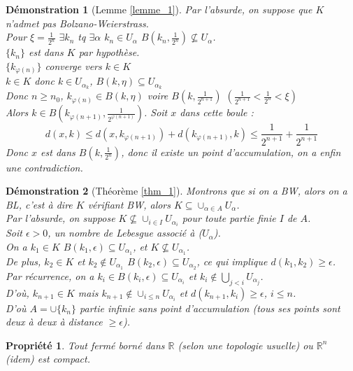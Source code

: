 \documentclass[a4paper, oneside]{report}
\theoremstyle{break}
\newtheorem{propr}[thm]{Propriété}
\newtheorem*{demo}{Démonstration}
\newcommand{\R}{\mathbb{R}}
\newcommand{\fracun}[1]{\frac{1}{#1}}
\begin{document}
\begin{demo}[Lemme \ref{lemme_1}]
Par l'absurde, on suppose que $K$ n'admet pas Bolzano-Weierstrass.\\
Pour $\xi = \fracun{2^n}$ $\exists k_n$ tq $\exists \alpha$ $k_n \in U_\alpha $ $B(k_n, \fracun{2^n}) \nsubseteq U_\alpha$.\\
$\{k_n\}$ est dans $K$ par hypothèse.\\
$\{k_{\varphi(n)}\}$ converge vers $k\in K$\\
$k\in K$ donc $k\in U_{\alpha_k}$, $B(k,\eta) \subseteq U_{\alpha_k}$\\
Donc $n\geq n_0$, $k_{\varphi(n)} \in B(k,\eta)$ voire $B(k,\fracun{2^{n+1}})$ $(\fracun{2^{n+1}} < \fracun{2^n}< \xi)$\\
Alors $k\in B(k_{\varphi(n+1)}, \fracun{2^{\varphi (n+1)}})$. Soit $x$ dans cette boule :
$$d(x,k) \leq d(x,k_{\varphi (n+1)}) + d(k_{\varphi (n+1)}, k) \leq \fracun{2^{n+1}} + \fracun{2^{n+1}}$$
Donc $x$ est dans $B(k,\fracun{2^n})$, donc il existe un point d'accumulation, on a enfin une contradiction.
\end{demo}


\begin{demo}[Théorème \ref{thm_1}]
Montrons que si on a BW, alors on a BL, c'est à dire $K$ vérifiant BW, alors $K\subseteq \cup_{\alpha \in A} U_\alpha$.\\
Par l'absurde, on suppose $K \nsubseteq \cup_{i\in I} U_{\alpha_i}$ pour toute partie finie $I$ de $A$.\\
Soit $\epsilon >0$, un nombre de Lebesgue associé à ($U_\alpha$).\\
On a $k_1\in K$ $B(k_1,\epsilon) \subseteq U_{\alpha_1}$, et $K\nsubseteq U_{\alpha_1}$.\\
De plus, $k_2\in K$ et $k_2\notin U_{\alpha_1}$ $B(k_2,\epsilon) \subseteq U_{\alpha_2}$, ce qui implique $d(k_1,k_2)\geq \epsilon$.\\
Par récurrence, on a $k_i\in B(k_i,\epsilon)\subseteq U_{\alpha_i}$ et $k_i\notin \bigcup_{j<i}U_{\alpha_j}$.\\
D'où, $k_{n+1}\in K$ mais $k_{n+1}\notin \cup_{i\leq n}U_{\alpha_i}$ et $d(k_{n+1}, k_i)\geq \epsilon$, $i\leq n$.\\
D'où $A=\cup \{k_n\}$ partie infinie sans point d'accumulation (tous ses points sont deux à deux à distance $\geq \epsilon$).
\end{demo}



\begin{propr}
Tout fermé borné dans $\R$ (selon une topologie usuelle) ou $\R^n$ (idem) est compact.
\end{propr}
\end{document}
